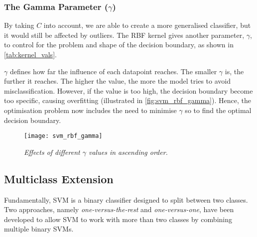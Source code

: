 \subsubsection{The Gamma Parameter ($\gamma$)}
By taking $C$ into account, we are able to create a more generalised classifier, but it would still be affected by outliers. The RBF kernel gives another parameter, $\gamma$, to control for the problem and shape of the decision boundary, as shown in \autoref{tab:kernel_vals}.

$\gamma$ defines how far the influence of each datapoint reaches. The smaller $\gamma$ is, the further it reaches. The higher the value, the more the model tries to avoid misclassification. However, if the value is too high, the decision boundary become too specific, causing overfitting (illustrated in \autoref{fig:svm_rbf_gamma}). Hence, the optimisation problem now includes the need to minimise $\gamma$ so to find the optimal decision boundary.

\begin{figure}[H]
  \centering
  \texttt{[image: svm\_rbf\_gamma]}
  \caption{\textit{Effects of different $\gamma$ values in ascending order.}}
  \label{fig:svm_rbf_gamma}
\end{figure}


\subsection{Multiclass Extension}
Fundamentally, SVM is a binary classifier designed to split between two classes. Two approaches, namely \textit{one-versus-the-rest} and \textit{one-versus-one}, have been developed to allow SVM to work with more than two classes by combining multiple binary SVMs.


